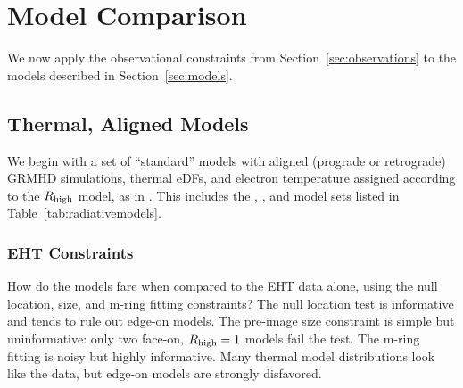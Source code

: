 \section{Model Comparison}\label{sec:comparisons}

We now apply the observational constraints from Section~\ref{sec:observations} to the models described in Section~\ref{sec:models}.

\subsection{Thermal, Aligned Models}\label{subsec:thermal}

We begin with a set of ``standard'' models with aligned (prograde or retrograde) GRMHD simulations, thermal eDFs, and electron temperature assigned according to the $R_\mathrm{high}$ model, as in .  This includes the \kharma, \bhac, and \hamr model sets listed in Table~\ref{tab:radiativemodels}.

\subsubsection{EHT Constraints}

How do the models fare when compared to the EHT data alone, using the null location, size, and m-ring fitting constraints?  The null location test is informative and tends to rule out edge-on models.  The pre-image size constraint is simple but uninformative: only two face-on, $R_\mathrm{high} = 1$ models fail the test.   The m-ring fitting is noisy but highly informative.  Many thermal model distributions look like the data, but edge-on models are strongly disfavored.



